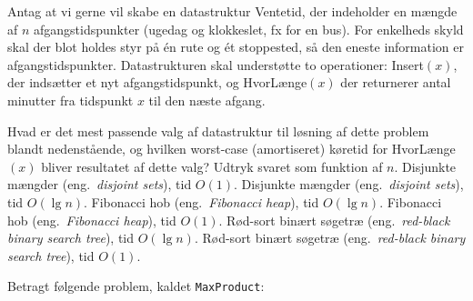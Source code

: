 Antag at vi gerne vil skabe en datastruktur {\sc Ventetid}, der indeholder en mængde af $n$ afgangstidspunkter (ugedag og klokkeslet, fx for en bus).
For enkelheds skyld skal der blot holdes styr på én rute og ét stoppested, så den eneste information er afgangstidspunkter.
Datastrukturen skal understøtte to operationer: {\sc Insert}$(x)$, der indsætter et nyt afgangstidspunkt, og {\sc HvorLænge}$(x)$ der returnerer antal minutter fra tidspunkt $x$ til den næste afgang.

\medskip

Hvad er det mest passende valg af datastruktur til løsning af dette problem blandt nedenstående, og hvilken worst-case (amortiseret) køretid for {\sc HvorLænge}$(x)$ bliver resultatet af dette valg?
Udtryk svaret som funktion af $n$.
\etsvar
\mulighederstart
\svar Disjunkte mængder (eng.~\emph{disjoint sets}), tid $O(1)$.
\svar Disjunkte mængder (eng.~\emph{disjoint sets}), tid $O(\lg n)$.
\svar Fibonacci hob (eng.~\emph{Fibonacci heap}), tid $O(\lg n)$.
\svar Fibonacci hob (eng.~\emph{Fibonacci heap}), tid $O(1)$.
\svar Rød-sort binært søgetræ (eng.~\emph{red-black binary search tree}), tid $O(\lg n)$. \korrekt
\svar Rød-sort binært søgetræ (eng.~\emph{red-black binary search tree}), tid $O(1)$.
\mulighederslut




\label{sec:maxproduct}
Betragt følgende problem, kaldet {\tt MaxProduct}: 
\newcommand{\maxproductproblem}{
Givet en liste af tal $x_1,\dots,x_n \in {\bf R}$ (kan være både positive og negative),
find en delmængde $I^*\subseteq \{1,\dots,n\}$ hvor produktet $\prod_{i\in I^*} x_i$ er så stort som muligt, dvs. for alle mængder $I\subseteq \{1,\dots,n\}$ skal gælde at $\prod_{i\in I} x_i \leq \prod_{i\in I^*} x_i$.

\medskip

{\bf Eksempel.} På input $x_1=-4,\, x_2=-0.5,\, x_3=0.5,\, x_4=0.5,\, x_5=1.5,\, x_6=6$ kan vi vælge $I=\{5,6\}$ og få et produkt på $1.5\cdot 6 = 9$, men et bedre valg er $I=\{1,2,5,6\}$ som giver produktet $(-4) \cdot (-0.5) \cdot 1.5\cdot 6 = 18$. Den tomme mængde $I=\emptyset$ giver per definition $\prod_{i\in \emptyset} x_i = 1$.
}

